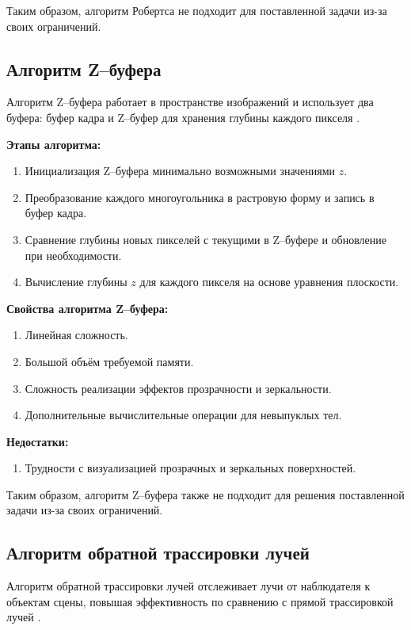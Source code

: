 Таким образом, алгоритм Робертса не подходит для поставленной задачи из-за своих ограничений.

\subsection{Алгоритм Z--буфера}

Алгоритм Z--буфера работает в пространстве изображений и использует два буфера: буфер кадра и Z--буфер для хранения глубины каждого пикселя \cite{rogers, rogers_book}.

\textbf{Этапы алгоритма:}
\begin{enumerate}[label=\arabic*)]
	\item Инициализация Z--буфера минимально возможными значениями $z$.
	\item Преобразование каждого многоугольника в растровую форму и запись в буфер кадра.
	\item Сравнение глубины новых пикселей с текущими в Z--буфере и обновление при необходимости.
	\item Вычисление глубины $z$ для каждого пикселя на основе уравнения плоскости.
\end{enumerate}

\textbf{Свойства алгоритма Z--буфера:}
\begin{enumerate}[label=\arabic*)]
	\item Линейная сложность.
	\item Большой объём требуемой памяти.
	\item Сложность реализации эффектов прозрачности и зеркальности.
	\item Дополнительные вычислительные операции для невыпуклых тел.
\end{enumerate}

\textbf{Недостатки:}
\begin{enumerate}[label=\arabic*)]
	\item Трудности с визуализацией прозрачных и зеркальных поверхностей.
\end{enumerate}

Таким образом, алгоритм Z--буфера также не подходит для решения поставленной задачи из-за своих ограничений.

\subsection{Алгоритм обратной трассировки лучей}

Алгоритм обратной трассировки лучей отслеживает лучи от наблюдателя к объектам сцены, повышая эффективность по сравнению с прямой трассировкой лучей \cite{shykin, bayackovskiy}.

